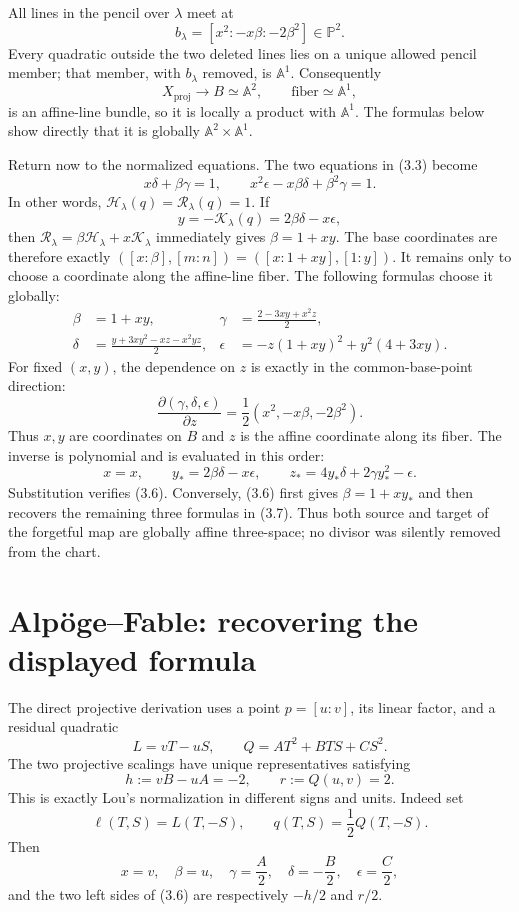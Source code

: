 \documentclass[11pt,a4paper]{article}
\theoremstyle{remark}
\newcommand{\A}{\mathbb A}
\newcommand{\PP}{\mathbb P}
\begin{document}
All lines in the pencil over $\lambda$ meet at
\[
  b_\lambda=[x^2:-x\beta:-2\beta^2]\in\PP^2.
\]
Every quadratic outside the two deleted lines lies on a unique allowed pencil
member; that member, with $b_\lambda$ removed, is $\A^1$.  Consequently
\[
  X_{\mathrm{proj}}\longrightarrow B\simeq\A^2,
  \qquad \text{fiber}\simeq\A^1,
\]
is an affine-line bundle, so it is locally a product with $\A^1$.  The
formulas below show directly that it is globally $\A^2\times\A^1$.

Return now to the normalized equations.  The two equations in (3.3) become
\[
  x\delta+\beta\gamma=1,\qquad
  x^2\epsilon-x\beta\delta+\beta^2\gamma=1.
\tag{3.6}
\]
In other words, $\mathcal H_\lambda(q)=\mathcal R_\lambda(q)=1$.  If
\[
  y=-\mathcal K_\lambda(q)=2\beta\delta-x\epsilon,
\]
then $\mathcal R_\lambda=\beta\mathcal H_\lambda+x\mathcal K_\lambda$ immediately gives
$\beta=1+xy$.  The base coordinates are therefore exactly
$([x:\beta],[m:n])=([x:1+xy],[1:y])$.  It remains only to choose a coordinate
along the affine-line fiber.  The following formulas choose it globally:
\begin{align*}
  \beta&=1+xy,&
  \gamma&=\frac{2-3xy+x^2z}{2},\\
  \delta&=\frac{y+3xy^2-xz-x^2yz}{2},&
  \epsilon&=-z(1+xy)^2+y^2(4+3xy).
\tag{3.7}
\end{align*}
For fixed $(x,y)$, the dependence on $z$ is exactly in the common-base-point
direction:
\[
  \frac{\partial(\gamma,\delta,\epsilon)}{\partial z}
  =\frac12(x^2,-x\beta,-2\beta^2).
\]
Thus $x,y$ are coordinates on $B$ and $z$ is the affine coordinate along its
fiber.  The inverse is polynomial and is evaluated in this order:
\[
  x=x,\qquad y_*=2\beta\delta-x\epsilon,\qquad
  z_*=4y_*\delta+2\gamma y_*^2-\epsilon.
\tag{3.8}
\]
Substitution verifies (3.6).  Conversely, (3.6) first gives
$\beta=1+xy_*$ and then recovers the remaining three formulas in (3.7).
Thus both source and target of the forgetful map are globally affine
three-space; no divisor was silently removed from the chart.

\section{Alp\"oge--Fable: recovering the displayed formula}

The direct projective derivation uses a point $p=[u:v]$, its linear factor,
and a residual quadratic
\[
L=vT-uS,\qquad Q=AT^2+BTS+CS^2.
\]
The two projective scalings have unique representatives satisfying
\[
  h:=vB-uA=-2,\qquad r:=Q(u,v)=2.
\tag{4.1}
\]
This is exactly Lou's normalization in different signs and units.  Indeed set
\[
  \ell(T,S)=L(T,-S),\qquad q(T,S)=\frac12Q(T,-S).
\tag{4.2}
\]
Then
\[
x=v,\quad\beta=u,\quad\gamma=\frac A2,\quad
\delta=-\frac B2,\quad\epsilon=\frac C2,
\tag{4.3}
\]
and the two left sides of (3.6) are respectively $-h/2$ and $r/2$.
\end{document}
